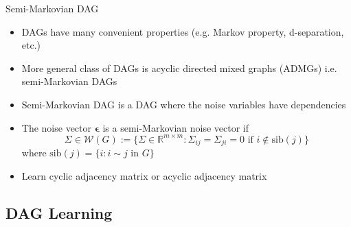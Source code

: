 \documentclass{beamer}
\begin{document}
\begin{frame}[allowframebreaks]{Semi-Markovian DAG}
    \begin{itemize}
        \item DAGs have many convenient properties (e.g. Markov property, d-separation, etc.)
        \item More general class of DAGs is acyclic directed mixed graphs (ADMGs) i.e. semi-Markovian DAGs
        \item Semi-Markovian DAG is a DAG where the noise variables have dependencies \cite{Shipster2006semimarkovian}
        \item The noise vector $\mathbf \epsilon$ is a semi-Markovian noise vector if
        \begin{equation*}
            \Sigma \in \mathcal{W}(G) := \{ \Sigma \in \mathbb R^{m\times m} : \Sigma_{ij} = \Sigma_{ji} = 0 \text{ if } i \notin \text{sib}(j) \}
        \end{equation*}
        where $\text{sib}(j) = \{i : i \sim j \text{ in } G\}$ \cite{wang2017empirical}
        \item Learn cyclic adjacency matrix \cite{wang2017empirical} or acyclic adjacency matrix
    \end{itemize}
\end{frame}

\subsection{DAG Learning}
\end{document}
